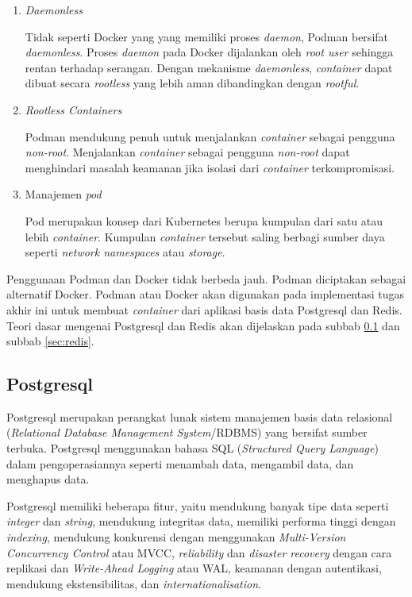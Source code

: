 \begin{enumerate}
  
  \item \emph{Daemonless}

    Tidak seperti Docker yang yang memiliki proses \emph{daemon}, Podman bersifat \emph{daemonless}.
    Proses \emph{daemon} pada Docker dijalankan oleh \emph{root user} sehingga rentan
    terhadap serangan. Dengan mekanisme \emph{daemonless}, \emph{container} dapat dibuat
    secara \emph{rootless} yang lebih aman dibandingkan dengan \emph{rootful}.

  \item \emph{Rootless Containers}

    Podman mendukung penuh untuk menjalankan \emph{container} sebagai pengguna \emph{non-root}.
    Menjalankan \emph{container} sebagai pengguna \emph{non-root} dapat menghindari masalah keamanan
    jika isolasi dari \emph{container} terkompromisasi.

  \item Manajemen \emph{pod}

    Pod merupakan konsep dari Kubernetes berupa kumpulan dari satu atau lebih \emph{container}.
    Kumpulan \emph{container} tersebut saling berbagi sumber daya seperti \emph{network namespaces}
    atau \emph{storage}.

\end{enumerate}

Penggunaan Podman dan Docker tidak berbeda jauh. Podman diciptakan sebagai alternatif Docker.
Podman atau Docker akan digunakan pada implementasi tugas akhir ini untuk membuat \emph{container}
dari aplikasi basis data Postgresql dan Redis. Teori dasar mengenai Postgresql dan Redis akan
dijelaskan pada subbab \ref{sec:postgresql} dan subbab \ref{sec:redis}.

\subsection{Postgresql}
\label{sec:postgresql}

Postgresql merupakan perangkat lunak sistem manajemen basis data relasional
(\emph{Relational Database Management System}/RDBMS) yang bersifat sumber terbuka.
Postgresql menggunakan bahasa SQL (\emph{Structured Query Language}) dalam pengoperasiannya
seperti menambah data, mengambil data, dan menghapus data.

Postgresql memiliki beberapa fitur, yaitu mendukung banyak tipe data seperti \emph{integer} dan
\emph{string}, mendukung integritas data, memiliki performa tinggi dengan \emph{indexing},
mendukung konkurensi dengan menggunakan \emph{Multi-Version Concurrency Control} atau MVCC,
\emph{reliability} dan \emph{disaster recovery} dengan cara replikasi dan \emph{Write-Ahead Logging} atau WAL,
keamanan dengan autentikasi, mendukung ekstensibilitas, dan \emph{internationalisation}.

